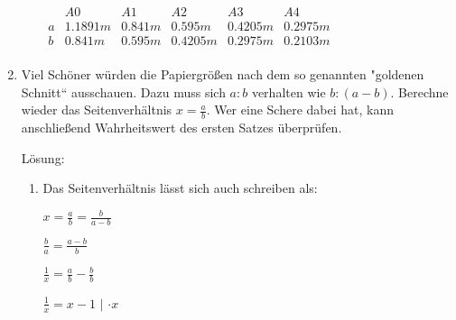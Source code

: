 \documentclass[../main.tex]{subfiles}
\begin{document}
\begin{enumerate}
\begin{enumerate}
		            \begin{math}
			            \begin{array}{cccccc}
				              & A0       & A1      & A2       & A3       & A4       \\
				            \hline
				            a & 1.1891 m & 0.841 m & 0.595 m  & 0.4205 m & 0.2975 m \\
				            b & 0.841 m  & 0.595 m & 0.4205 m & 0.2975 m & 0.2103 m \\
			            \end{array}
		            \end{math}
	      \end{enumerate}
	\item Viel Schöner würden die Papiergrößen nach dem so genannten "goldenen Schnitt“ ausschauen.
	      Dazu muss sich \begin{math}
		      a : b
	      \end{math} verhalten wie \begin{math}
		      b : (a - b)
	      \end{math}. Berechne wieder das Seitenverhältnis \begin{math}
		      x = \frac{a}{b}
	      \end{math}. Wer eine Schere dabei hat,
	      kann anschließend Wahrheitswert des ersten Satzes überprüfen.

	      Lösung:
	      \begin{enumerate}
		      \item Das Seitenverhältnis lässt sich auch schreiben als:

		            \begin{math}
			            x
			            = \frac{a}{b}
			            = \frac{b}{a-b}
		            \end{math}

		            \begin{math}
			            \frac{b}{a}
			            = \frac{a-b}{b}
		            \end{math}

		            \begin{math}
			            \frac{1}{x}
			            = \frac{a}{b} - \frac{b}{b}
		            \end{math}

		            \begin{math}
			            \frac{1}{x}
			            = x - 1
		            \end{math}
		            \(|\) \begin{math}
			            \cdot x
		            \end{math}


\end{enumerate}
\end{enumerate}
\end{document}
